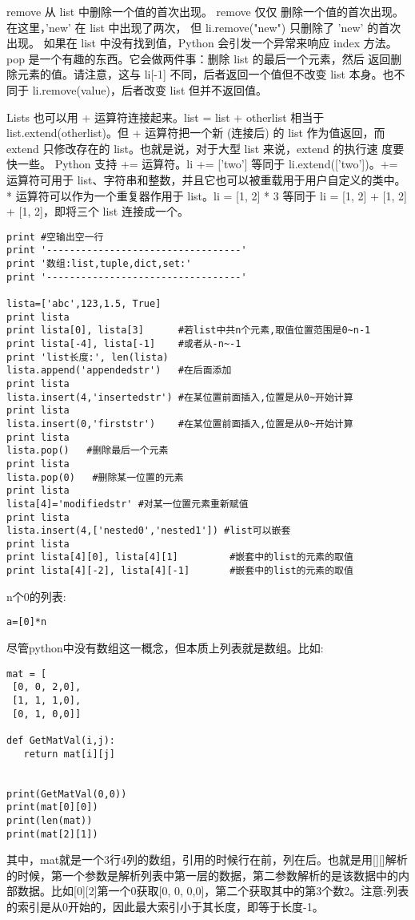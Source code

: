 \documentclass[twoside,11pt]{book}
\begin{document}
remove 从 list 中删除一个值的首次出现。
remove 仅仅 删除一个值的首次出现。在这里，'new' 在 list 中出现了两次， 但 li.remove("new") 只删除了 'new' 的首次出现。
如果在 list 中没有找到值，Python 会引发一个异常来响应 index 方法。
pop 是一个有趣的东西。它会做两件事：删除 list 的最后一个元素，然后 返回删除元素的值。请注意，这与 li[-1] 不同，后者返回一个值但不改变 list 本身。也不同于 li.remove(value)，后者改变 list 但并不返回值。

Lists 也可以用 + 运算符连接起来。list = list + otherlist 相当于
list.extend(otherlist)。但 + 运算符把一个新 (连接后) 的 list 作为值返回，而
extend 只修改存在的 list。也就是说，对于大型 list 来说，extend 的执行速 度要快一些。
Python 支持 += 运算符。li += ['two'] 等同于 li.extend(['two'])。+= 运算符可用于 list、字符串和整数，并且它也可以被重载用于用户自定义的类中。
* 运算符可以作为一个重复器作用于 list。li = [1, 2] * 3 等同于 li = [1, 2] + [1,
2] + [1, 2]，即将三个 list 连接成一个。

\begin{lstlisting}
print #空输出空一行
print '----------------------------------'
print '数组:list,tuple,dict,set:'
print '----------------------------------'

lista=['abc',123,1.5, True]
print lista
print lista[0], lista[3]      #若list中共n个元素,取值位置范围是0~n-1
print lista[-4], lista[-1]    #或者从-n~-1
print 'list长度:', len(lista)
lista.append('appendedstr')   #在后面添加
print lista
lista.insert(4,'insertedstr') #在某位置前面插入,位置是从0~开始计算
print lista
lista.insert(0,'firststr')    #在某位置前面插入,位置是从0~开始计算
print lista
lista.pop()   #删除最后一个元素
print lista
lista.pop(0)   #删除某一位置的元素
print lista
lista[4]='modifiedstr' #对某一位置元素重新赋值
print lista
lista.insert(4,['nested0','nested1']) #list可以嵌套
print lista
print lista[4][0], lista[4][1]         #嵌套中的list的元素的取值
print lista[4][-2], lista[4][-1]       #嵌套中的list的元素的取值
\end{lstlisting}

n个0的列表:
\begin{lstlisting}
a=[0]*n
\end{lstlisting}

尽管python中没有数组这一概念，但本质上列表就是数组。比如:
\begin{lstlisting}
mat = [
 [0, 0, 2,0],
 [1, 1, 1,0],
 [0, 1, 0,0]]

def GetMatVal(i,j):
   return mat[i][j]


print(GetMatVal(0,0))
print(mat[0][0])
print(len(mat))
print(mat[2][1])
\end{lstlisting}
其中，mat就是一个3行4列的数组，引用的时候行在前，列在后。也就是用[][]解析的时候，第一个参数是解析列表中第一层的数据，第二参数解析的是该数据中的内部数据。比如[0][2]第一个0获取[0, 0, 0,0]，第二个获取其中的第3个数2。注意:列表的索引是从0开始的，因此最大索引小于其长度，即等于长度-1。
\end{document}
